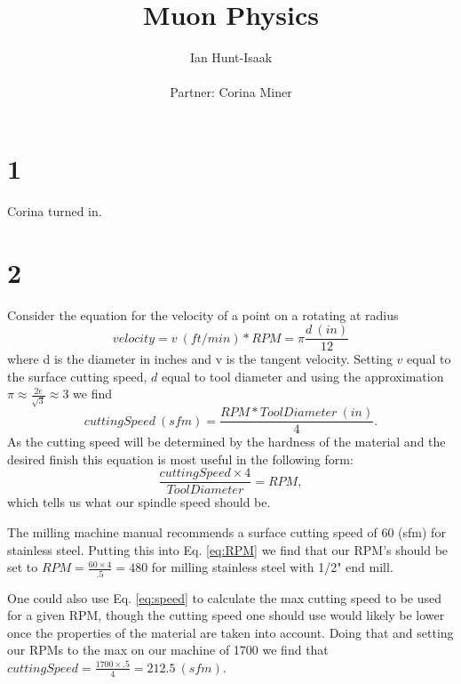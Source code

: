 \documentclass[11pt,letterpaper]{article}
\title{Muon Physics}
\author{Ian Hunt-Isaak\\ \begin{small}
Partner: Corina Miner
\end{small}}
\begin{document}
\date{}
\maketitle
\section*{1}
Corina turned in.
\section*{2} %
Consider the equation for the velocity of a point on a rotating at radius
\begin{equation}
velocity = v\ (ft/min) * RPM = \pi \frac{d\ (in)}{12}
\end{equation}
where d is the diameter in inches and v is the tangent velocity.
Setting $v$ equal to the surface cutting speed, $d$ equal to tool diameter and using the approximation $\pi \approx \frac{2e}{\sqrt{3}} \approx 3$ we find
\begin{equation}
\label{eq:speed}
cuttingSpeed\ (sfm)= \frac{RPM*Tool Diameter\ (in)}{4}.
\end{equation}
As the cutting speed will be determined by the hardness of the material and the desired finish this equation is most useful in the following form:
\begin{equation}
\label{eq:RPM}
\frac{cuttingSpeed \times 4}{ToolDiameter} = RPM,
\end{equation}
which tells us what our spindle speed should be. 

The milling machine manual recommends a surface cutting speed of 60 (sfm) for stainless steel. Putting this into Eq. \ref{eq:RPM} we find that our RPM's should be set to $RPM = \frac{60 \times 4}{.5} = 480$ for milling stainless steel with 1/2" end mill.

One could also use Eq. \ref{eq:speed} to calculate the max cutting speed to be used for a given RPM, though the cutting speed one should use would likely be lower once the properties of the material are taken into account. Doing that and setting our RPMs to the max on our machine of 1700 we find that $cuttingSpeed = \frac{1700 \times .5}{4} =212.5\ (sfm)$.
\end{document}
